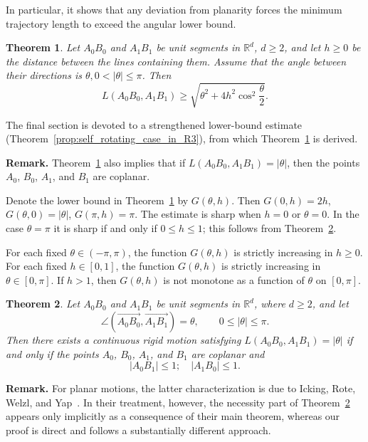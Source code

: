 \documentclass[a4paper,12pt,reqno]{amsart}
\newtheorem{theorem}{Theorem}
\begin{document}
In particular, it shows that any deviation from planarity forces the minimum trajectory length to exceed the angular lower bound.

\begin{theorem}
    \label{thm:theorem_2}
Let $A_0B_0$ and $A_1B_1$ be unit segments in $\mathbb{R}^d$, $d\ge 2$,
and let $h\ge 0$ be the distance between the lines containing them. 
Assume that the angle between their directions is $\theta, 0<|\theta|\le \pi$. Then
\[
L(A_0B_0,A_1B_1)
\ge
\sqrt{
\theta^2+ 4
h^2\cos^2\frac{\theta}{2}
}.
\]
\end{theorem}

The final section is devoted to a strengthened lower-bound estimate (Theorem~\ref{prop:self_rotating_case_in_R3}), from which Theorem~\ref{thm:theorem_2} is derived.

\smallskip
\noindent \textbf{Remark.} Theorem~\ref{thm:theorem_2} also implies that if $L(A_0B_0,A_1B_1)=|\theta|$, then the points $A_0$, $B_0$, $A_1$, and $B_1$ are coplanar. 

Denote the lower bound in Theorem~\ref{thm:theorem_2} by $G(\theta,h)$. Then $G(0,h)=2h$, $G(\theta,0)=|\theta|$, $G(\pi,h)=\pi$. The estimate is sharp when $h=0$ or $\theta=0$. In the case $\theta=\pi$ it is sharp if and only if $0\le h\le 1$; this follows from Theorem~\ref{thm:rotation_prop_1}. 

For each fixed $\theta\in (-\pi,\pi)$, the function $G(\theta, h)$ is strictly increasing in $h\ge 0$. For each fixed $h\in [0,1]$, the function $G(\theta,h)$ is strictly increasing in $\theta\in[0,\pi]$. If $h>1$, then $G(\theta, h)$ is not monotone as a function of $\theta$ on $[0,\pi]$.

\begin{theorem}
\label{thm:rotation_prop_1}
Let $A_0B_0$ and $A_1B_1$ be unit segments in $\mathbb{R}^d$, where $d\ge 2$, and let
\[
\angle(\overrightarrow{A_0B_0},\overrightarrow{A_1B_1})=\theta,
\qquad 0\le |\theta|\le \pi.
\] 
Then there exists a continuous rigid motion satisfying $L(A_0B_0,A_1B_1)=|\theta|$
if and only if the points $A_0$, $B_0$, $A_1$, and $B_1$ are coplanar and
\begin{equation}
\label{eq:rotating_1}
|A_0B_1|\le 1;\quad |A_1B_0|\le 1.
\end{equation}
\end{theorem}

\smallskip
\noindent \textbf{Remark.} For planar motions, the latter characterization is due to Icking, Rote, Welzl, and Yap~\cite{IckingRoteWelzlYap1993}. In their treatment, however, the necessity part of Theorem~\ref{thm:rotation_prop_1} appears only implicitly as a consequence of their main theorem, whereas our proof is direct and follows a substantially different approach.
\end{document}
